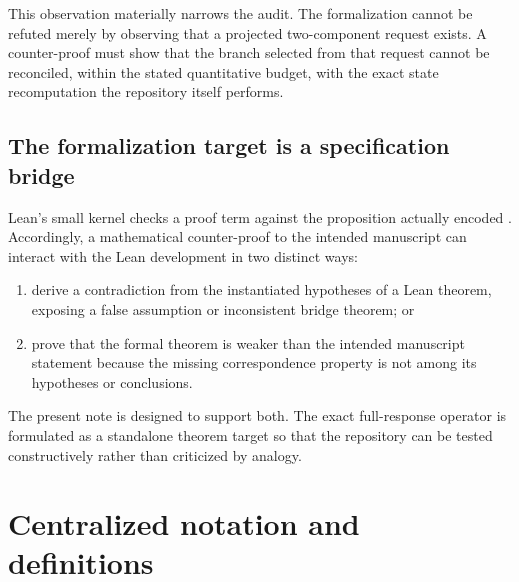 \documentclass[12pt]{article}
\theoremstyle{plain}
\theoremstyle{definition}
\theoremstyle{remark}
\begin{document}
This observation materially narrows the audit. The formalization cannot be refuted merely by observing that a projected two-component request exists. A counter-proof must show that the branch selected from that request cannot be reconciled, within the stated quantitative budget, with the exact state recomputation the repository itself performs.

\subsection{The formalization target is a specification bridge}
Lean's small kernel checks a proof term against the proposition actually encoded \cite{deMouraEtAl2015,Lean4Reference}. Accordingly, a mathematical counter-proof to the intended manuscript can interact with the Lean development in two distinct ways:
\begin{enumerate}[label=(\roman*),leftmargin=2.1em,itemsep=0.1em]
\item derive a contradiction from the instantiated hypotheses of a Lean theorem, exposing a false assumption or inconsistent bridge theorem; or
\item prove that the formal theorem is weaker than the intended manuscript statement because the missing correspondence property is not among its hypotheses or conclusions.
\end{enumerate}
The present note is designed to support both. The exact full-response operator is formulated as a standalone theorem target so that the repository can be tested constructively rather than criticized by analogy.

\section{Centralized notation and definitions}\label{sec:notation}
\end{document}
